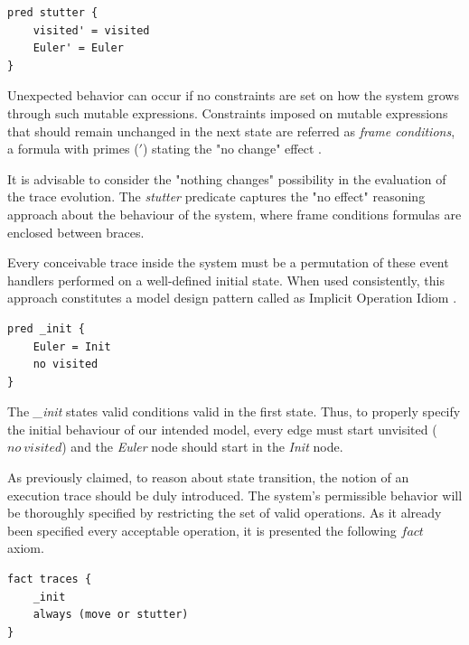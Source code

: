 \begin{lstlisting}[title={\textit{Eulerian} stutter event.}, otherkeywords = {pred, ', \=}, floatplacement=H]
pred stutter {
    visited' = visited
    Euler' = Euler
}
\end{lstlisting}

Unexpected behavior can occur if no constraints are set on how the system grows through such mutable expressions. Constraints imposed on mutable expressions that should remain unchanged in the next state are referred as \textit{frame conditions}, a formula with primes ($'$) stating the "no change" effect \cite{alloy-docs}.

It is advisable to consider the "nothing changes" possibility in the evaluation of the trace evolution. The \textit{stutter} predicate captures the "no effect" reasoning approach about the behaviour of the system, where frame conditions formulas are enclosed between braces.

Every conceivable trace inside the system must be a permutation of these event handlers performed on a well-defined initial state. When used consistently, this approach constitutes a model design pattern called as Implicit Operation Idiom \cite{gheyi2007formally}.

\begin{lstlisting}[title={\textit{Eulerian} Initial State.}, otherkeywords = {pred, ', \=, no}, floatplacement=H]
pred _init {
    Euler = Init
    no visited
}
\end{lstlisting}

The \textit{\_init} states valid conditions valid in the first state. Thus, to properly specify the initial behaviour of our intended model, every edge must start unvisited ($no\ visited$) and the \textit{Euler} node should start in the \textit{Init} node.

As previously claimed, to reason about state transition, the notion of an execution trace should be duly introduced. The system's permissible behavior will be thoroughly specified by restricting the set of valid operations. As it already been specified every acceptable operation, it is presented the following $fact$ axiom. 

\begin{lstlisting}[title={Trace constraint through the use of an axiom.}, otherkeywords = {fact, ', \=, no, eventually, in\ , and, always, or}, floatplacement=H]
fact traces {
    _init
    always (move or stutter)
}
\end{lstlisting}

